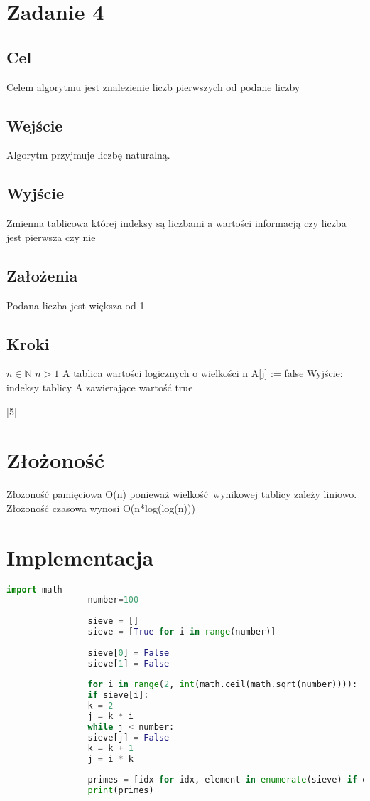 \documentclass{article}
\begin{document}
		\section{Zadanie 4}
			\subsection{Cel}
			Celem algorytmu jest znalezienie liczb pierwszych od podane liczby
			\subsection{Wejście}
			Algorytm przyjmuje liczbę naturalną.
			\subsection{Wyjście}
			Zmienna tablicowa której indeksy są liczbami a wartości informacją czy liczba jest pierwsza czy nie
			\subsection{Założenia}
			Podana liczba jest większa od 1
			\subsection{Kroki}
			\begin{algorithmic}[5]
				\Require $n \in  \mathbb{N}$
				\Ensure $n > 1$
				\State A tablica wartości logicznych o wielkości n
							\State A[j] := false
						\EndFor
					\EndIf
				\EndFor
				\State Wyjście: indeksy tablicy A zawierające wartość true
			\end{algorithmic}[5]
		\section{Złożoność}
			Złożoność pamięciowa O(n) ponieważ wielkość wynikowej tablicy zależy liniowo.
			Złożoność czasowa wynosi O(n*log(log(n)))
		\section{Implementacja}
			\begin{lstlisting}[language=Python, caption=implementacja sita Erostenesa]
				import math
				number=100
				
				sieve = []
				sieve = [True for i in range(number)]
				
				sieve[0] = False
				sieve[1] = False
				
				for i in range(2, int(math.ceil(math.sqrt(number)))):
				if sieve[i]:
				k = 2
				j = k * i
				while j < number:
				sieve[j] = False
				k = k + 1
				j = i * k
				
				primes = [idx for idx, element in enumerate(sieve) if element == True]
				print(primes)
			\end{lstlisting}
\end{document}
